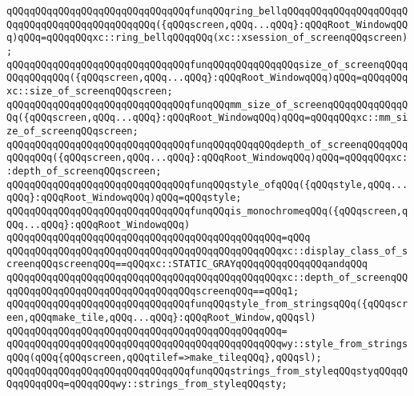 \verb|qQQqqQQqqQQqqQQqqQQqqQQqqQQqqQQqfunqQQqring_bellqQQqqQQqqQQqqQQqqQQqqQQqqQQqqQQqqQQqqQQqqQQqqQQq({qQQqscreen,qQQq...qQQq}:qQQqRoot_WindowqQQq)qQQq=qQQqqQQqxc::ring_bellqQQqqQQq(xc::xsession_of_screenqQQqscreen);|\newline
\newline
\verb|qQQqqQQqqQQqqQQqqQQqqQQqqQQqqQQqfunqQQqqQQqqQQqqQQqsize_of_screenqQQqqQQqqQQqqQQq({qQQqscreen,qQQq...qQQq}:qQQqRoot_WindowqQQq)qQQq=qQQqqQQqxc::size_of_screenqQQqscreen;|\newline
\verb|qQQqqQQqqQQqqQQqqQQqqQQqqQQqqQQqfunqQQqmm_size_of_screenqQQqqQQqqQQqqQQq({qQQqscreen,qQQq...qQQq}:qQQqRoot_WindowqQQq)qQQq=qQQqqQQqxc::mm_size_of_screenqQQqscreen;|\newline
\verb|qQQqqQQqqQQqqQQqqQQqqQQqqQQqqQQqfunqQQqqQQqqQQqdepth_of_screenqQQqqQQqqQQqqQQq({qQQqscreen,qQQq...qQQq}:qQQqRoot_WindowqQQq)qQQq=qQQqqQQqxc::depth_of_screenqQQqscreen;|\newline
\newline
\verb|qQQqqQQqqQQqqQQqqQQqqQQqqQQqqQQqfunqQQqstyle_ofqQQq({qQQqstyle,qQQq...qQQq}:qQQqRoot_WindowqQQq)qQQq=qQQqstyle;|\newline
\newline
\verb|qQQqqQQqqQQqqQQqqQQqqQQqqQQqqQQqfunqQQqis_monochromeqQQq({qQQqscreen,qQQq...qQQq}:qQQqRoot_WindowqQQq)|\newline
\verb|qQQqqQQqqQQqqQQqqQQqqQQqqQQqqQQqqQQqqQQqqQQqqQQq=qQQq|\newline
\verb|qQQqqQQqqQQqqQQqqQQqqQQqqQQqqQQqqQQqqQQqqQQqqQQqxc::display_class_of_screenqQQqscreenqQQq==qQQqxc::STATIC_GRAYqQQqqQQqqQQqqQQqandqQQq|\newline
\verb|qQQqqQQqqQQqqQQqqQQqqQQqqQQqqQQqqQQqqQQqqQQqqQQqxc::depth_of_screenqQQqqQQqqQQqqQQqqQQqqQQqqQQqqQQqqQQqscreenqQQq==qQQq1;|\newline
\newline
\verb|qQQqqQQqqQQqqQQqqQQqqQQqqQQqqQQqfunqQQqstyle_from_stringsqQQq({qQQqscreen,qQQqmake_tile,qQQq...qQQq}:qQQqRoot_Window,qQQqsl)|\newline
\verb|qQQqqQQqqQQqqQQqqQQqqQQqqQQqqQQqqQQqqQQqqQQqqQQq=|\newline
\verb|qQQqqQQqqQQqqQQqqQQqqQQqqQQqqQQqqQQqqQQqqQQqqQQqwy::style_from_stringsqQQq(qQQq{qQQqscreen,qQQqtilef=>make_tileqQQq},qQQqsl);|\newline
\newline
\verb|qQQqqQQqqQQqqQQqqQQqqQQqqQQqqQQqfunqQQqstrings_from_styleqQQqstyqQQqqQQqqQQqqQQq=qQQqqQQqwy::strings_from_styleqQQqsty;|\newline
